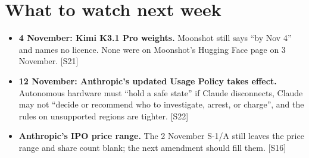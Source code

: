 \documentclass[11pt,a4paper]{article}
\newcommand{\srcref}[1]{\textcolor{brandaccent}{[S#1]}}
\begin{document}
\section{What to watch next week}

\begin{itemize}
  \item \textbf{4 November: Kimi K3.1 Pro weights.} Moonshot still says ``by Nov 4'' and names no licence. None were on Moonshot's Hugging Face page on 3 November. \srcref{21}
  \item \textbf{12 November: Anthropic's updated Usage Policy takes effect.} Autonomous hardware must ``hold a safe state'' if Claude disconnects, Claude may not ``decide or recommend who to investigate, arrest, or charge'', and the rules on unsupported regions are tighter. \srcref{22}
  \item \textbf{Anthropic's IPO price range.} The 2 November S-1/A still leaves the price range and share count blank; the next amendment should fill them. \srcref{16}
\end{itemize}

\end{document}
